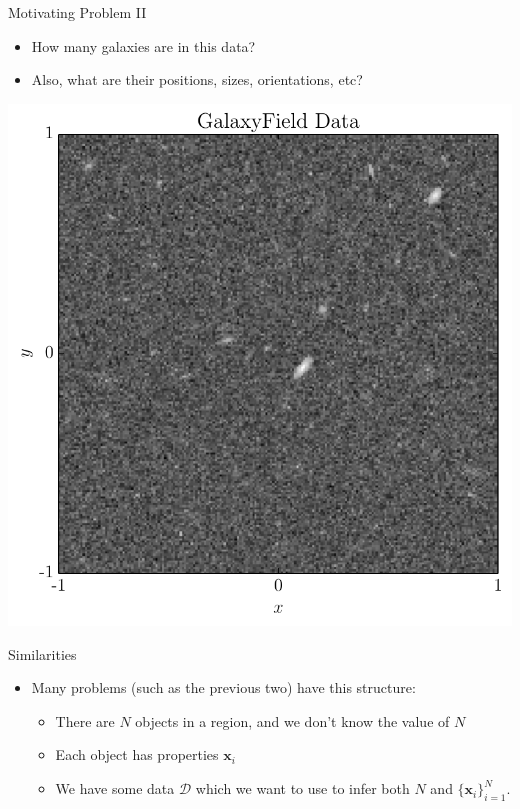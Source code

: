 \begin{frame}[t]{Motivating Problem II}
\begin{itemize}
\item How many galaxies are in this data?
\item Also, what are their positions, sizes, orientations, etc?
\end{itemize}
\begin{center}
\includegraphics[scale=0.35]{../Paper/galaxyfield_data.pdf}
\end{center}
\end{frame}


\begin{frame}[t]{Similarities}
\begin{itemize}
\item Many problems (such as the previous two) have this structure:
\vspace{20pt}
  \begin{itemize}
  \setlength{\itemsep}{20pt}
  \item There are $N$ objects in a region, and we don't know the value of $N$
  \item Each object has properties $\mathbf{x}_i$
  \item We have some data $\mathcal{D}$ which we want to use to infer both $N$
        and $\{\mathbf{x}_i\}_{i=1}^N$.
  \end{itemize}
\end{itemize}
\end{frame}



